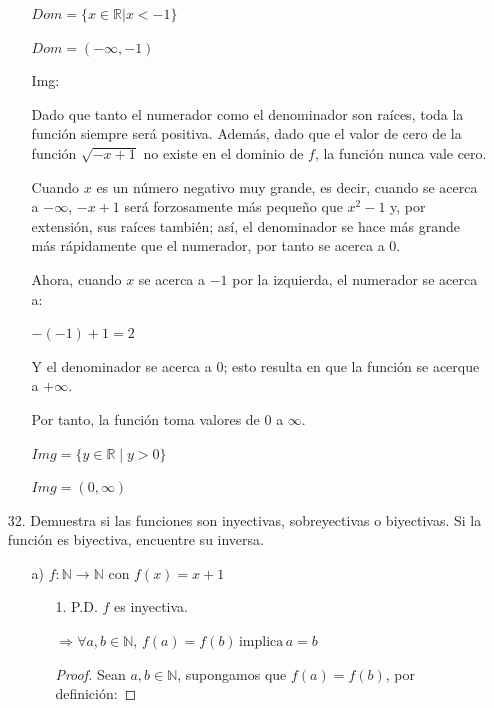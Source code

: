 \documentclass{article}
\begin{document}
\begin{enumerate}
\begin{enumerate}
        $Dom = \{x \in \mathbb{R} | x < -1\}$

        $Dom = (-\infty, -1)$
        \vspace{\baselineskip}

        Img:

        Dado que tanto el numerador como el denominador son raíces, toda la función siempre será positiva. Además, dado que el valor de cero de la función \(\sqrt{-x+1}\) no existe en el dominio de \(f\), la función nunca vale cero.
        \vspace{\baselineskip}
        
        Cuando \(x\) es un número negativo muy grande, es decir, cuando se acerca a \(-\infty\), \(-x+1\) será forzosamente más pequeño que \(x^2-1\) y, por extensión, sus raíces también; así, el denominador se hace más grande más rápidamente que el numerador, por tanto se acerca a 0.
        \vspace{\baselineskip}
        
        Ahora, cuando \(x\) se acerca a \(-1\) por la izquierda, el numerador se acerca a:
        
        $-(-1)+1 = 2$
        \vspace{\baselineskip}
        
        Y el denominador se acerca a 0; esto resulta en que la función se acerque a \(+\infty\).
        \vspace{\baselineskip}
        
        Por tanto, la función toma valores de 0 a \(\infty\).
        \vspace{\baselineskip}
        
        $Img = \{y \in \mathbb{R} \mid y > 0\}$
        
        $Img = (0, \infty)$
\end{enumerate}

\item[32.] Demuestra si las  funciones son inyectivas, sobreyectivas o biyectivas. Si la función es biyectiva, encuentre su inversa.
    \begin{enumerate}
        \item[a)] \(f: \mathbb{N} \rightarrow \mathbb{N} \text{ con } f(x) = x + 1\)
            \begin{enumerate}
                \item[1.] P.D. \(f\) es inyectiva.
                    
                    $\Rightarrow \forall a, b \in \mathbb{N}, \, f(a) = f(b) \, \text{implica} \, a = b$
                    \begin{proof}
                        Sean \(a, b \in \mathbb{N}\), supongamos que \(f(a) = f(b)\), por definición:


\end{proof}
\end{enumerate}
\end{enumerate}
\end{enumerate}
\end{document}

